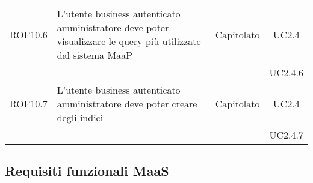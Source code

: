 \begin{longtable}{|c|p{6cm}|c|c|}
\midrule
ROF10.6
& L'utente business autenticato amministratore deve poter visualizzare le query più utilizzate dal sistema MaaP
& Capitolato
& UC2.4\\
& & & UC2.4.6
\\

\midrule
ROF10.7
& L'utente business autenticato amministratore deve poter creare degli indici
& Capitolato
& UC2.4\\
& & & UC2.4.7
\\

\end{longtable}

\newpage
\subsection{Requisiti funzionali MaaS}
